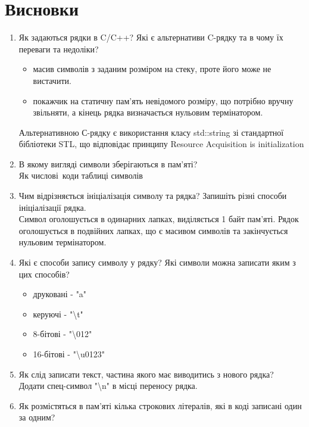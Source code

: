 \section{Висновки}
\label{sec:summary}

\begin{enumerate}
      \item Як задаються рядки в C/C++? Які є альтернативи C-рядку та в чому їх переваги та недоліки?
            \begin{itemize}
                  \item масив символів з заданим розміром на стеку, проте його може не вистачити.
                  \item покажчик на статичну пам'ять невідомого розміру,
                        що потрібно вручну звільняти,
                        а кінець рядка визначається нульовим термінатором.
            \end{itemize}
            Альтернативною С-рядку є використання класу std::string
            зі стандартної бібліотеки STL,
            що відповідає принципу Resource Acquisition is initialization
      \item В якому вигляді символи зберігаються в пам'яті? \\
            Як числові коди таблиці символів
      \item Чим відрізняється ініціалізація символу та рядка? Запишіть різні способи ініціалізації рядка. \\
            Символ оголошується в одинарних лапках, виділяється 1 байт пам'яті.
            Рядок оголошується в подвійних лапках, що є масивом символів та закінчується нульовим термінатором.
      \item Які є способи запису символу у рядку? Які символи можна записати яким з цих способів?
            \begin{itemize}
                  \item друковані - "a"
                  \item керуючі - "\textbackslash t"
                  \item 8-бітові - "\textbackslash 012"
                  \item 16-бітові - "\textbackslash u0123"
            \end{itemize}
      \item Як слід записати текст, частина якого має виводитись з нового рядка? \\
            Додати спец-символ "\textbackslash n" в місці переносу рядка.
      \item Як розмістяться в пам'яті кілька строкових літералів, які в коді записані один за одним? \\

\end{enumerate}
